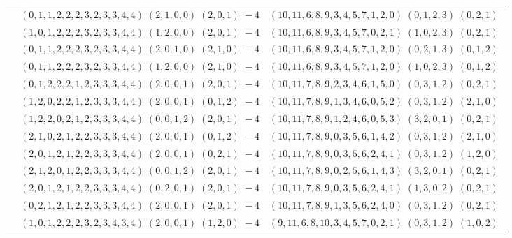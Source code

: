 \documentclass[11pt]{article}
\begin{document}
\begin{longtable}[l]{|c|c|c|}
 \cline{2-3} 
 & $(0 ,1 ,1 ,2 ,2 ,2 ,3 ,2 ,3 ,3 ,4 ,4) \;(2 ,1 ,0 ,0) \;(2 ,0 ,1) \;-4$ & $(10 ,11 ,6 ,8 ,9 ,3 ,4 ,5 ,7 ,1 ,2 ,0) \;(0 ,1 ,2 ,3) \;(0 ,2 ,1) \;$\\ 
 \cline{2-3} 
 & $(1 ,0 ,1 ,2 ,2 ,2 ,3 ,2 ,3 ,3 ,4 ,4) \;(1 ,2 ,0 ,0) \;(2 ,0 ,1) \;-4$ & $(10 ,11 ,6 ,8 ,9 ,3 ,4 ,5 ,7 ,0 ,2 ,1) \;(1 ,0 ,2 ,3) \;(0 ,2 ,1) \;$\\ 
 \cline{2-3} 
 & $(0 ,1 ,1 ,2 ,2 ,2 ,3 ,2 ,3 ,3 ,4 ,4) \;(2 ,0 ,1 ,0) \;(2 ,1 ,0) \;-4$ & $(10 ,11 ,6 ,8 ,9 ,3 ,4 ,5 ,7 ,1 ,2 ,0) \;(0 ,2 ,1 ,3) \;(0 ,1 ,2) \;$\\ 
 \cline{2-3} 
 & $(0 ,1 ,1 ,2 ,2 ,2 ,3 ,2 ,3 ,3 ,4 ,4) \;(1 ,2 ,0 ,0) \;(2 ,1 ,0) \;-4$ & $(10 ,11 ,6 ,8 ,9 ,3 ,4 ,5 ,7 ,1 ,2 ,0) \;(1 ,0 ,2 ,3) \;(0 ,1 ,2) \;$\\ 
 \cline{2-3} 
 & $(0 ,1 ,2 ,2 ,2 ,1 ,2 ,3 ,3 ,3 ,4 ,4) \;(2 ,0 ,0 ,1) \;(2 ,0 ,1) \;-4$ & $(10 ,11 ,7 ,8 ,9 ,2 ,3 ,4 ,6 ,1 ,5 ,0) \;(0 ,3 ,1 ,2) \;(0 ,2 ,1) \;$\\ 
 \cline{2-3} 
 & $(1 ,2 ,0 ,2 ,2 ,1 ,2 ,3 ,3 ,3 ,4 ,4) \;(2 ,0 ,0 ,1) \;(0 ,1 ,2) \;-4$ & $(10 ,11 ,7 ,8 ,9 ,1 ,3 ,4 ,6 ,0 ,5 ,2) \;(0 ,3 ,1 ,2) \;(2 ,1 ,0) \;$\\ 
 \cline{2-3} 
 & $(1 ,2 ,2 ,0 ,2 ,1 ,2 ,3 ,3 ,3 ,4 ,4) \;(0 ,0 ,1 ,2) \;(2 ,0 ,1) \;-4$ & $(10 ,11 ,7 ,8 ,9 ,1 ,2 ,4 ,6 ,0 ,5 ,3) \;(3 ,2 ,0 ,1) \;(0 ,2 ,1) \;$\\ 
 \cline{2-3} 
 & $(2 ,1 ,0 ,2 ,1 ,2 ,2 ,3 ,3 ,3 ,4 ,4) \;(2 ,0 ,0 ,1) \;(0 ,1 ,2) \;-4$ & $(10 ,11 ,7 ,8 ,9 ,0 ,3 ,5 ,6 ,1 ,4 ,2) \;(0 ,3 ,1 ,2) \;(2 ,1 ,0) \;$\\ 
 \cline{2-3} 
 & $(2 ,0 ,1 ,2 ,1 ,2 ,2 ,3 ,3 ,3 ,4 ,4) \;(2 ,0 ,0 ,1) \;(0 ,2 ,1) \;-4$ & $(10 ,11 ,7 ,8 ,9 ,0 ,3 ,5 ,6 ,2 ,4 ,1) \;(0 ,3 ,1 ,2) \;(1 ,2 ,0) \;$\\ 
 \cline{2-3} 
 & $(2 ,1 ,2 ,0 ,1 ,2 ,2 ,3 ,3 ,3 ,4 ,4) \;(0 ,0 ,1 ,2) \;(2 ,0 ,1) \;-4$ & $(10 ,11 ,7 ,8 ,9 ,0 ,2 ,5 ,6 ,1 ,4 ,3) \;(3 ,2 ,0 ,1) \;(0 ,2 ,1) \;$\\ 
 \cline{2-3} 
 & $(2 ,0 ,1 ,2 ,1 ,2 ,2 ,3 ,3 ,3 ,4 ,4) \;(0 ,2 ,0 ,1) \;(2 ,0 ,1) \;-4$ & $(10 ,11 ,7 ,8 ,9 ,0 ,3 ,5 ,6 ,2 ,4 ,1) \;(1 ,3 ,0 ,2) \;(0 ,2 ,1) \;$\\ 
 \cline{2-3} 
 & $(0 ,2 ,1 ,2 ,1 ,2 ,2 ,3 ,3 ,3 ,4 ,4) \;(2 ,0 ,0 ,1) \;(2 ,0 ,1) \;-4$ & $(10 ,11 ,7 ,8 ,9 ,1 ,3 ,5 ,6 ,2 ,4 ,0) \;(0 ,3 ,1 ,2) \;(0 ,2 ,1) \;$\\ 
 \cline{2-3} 
 & $(1 ,0 ,1 ,2 ,2 ,2 ,3 ,2 ,3 ,4 ,3 ,4) \;(2 ,0 ,0 ,1) \;(1 ,2 ,0) \;-4$ & $(9 ,11 ,6 ,8 ,10 ,3 ,4 ,5 ,7 ,0 ,2 ,1) \;(0 ,3 ,1 ,2) \;(1 ,0 ,2) \;$\\ 

\end{longtable}
\end{document}
